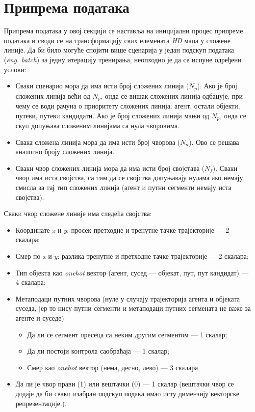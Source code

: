 \documentclass[11pt,oneside]{memoir}
\begin{document}
\section{Припрема података}

Припрема података у овој секцији се наставља на иницијални процес припреме података и своди се на трансформацију свих елемената
\textit{HD} мапа у сложене линије. Да би било могуће спојити више сценарија у један подскуп података (\textit{eng. batch}) 
за једну итерацију тренирања, неопходно је да се испуне одређени услови:
\begin{itemize}
  \item Сваки сценарио мора да има исти број сложених линија ($N_{p}$). Ако је број сложених линија већи од $N_{p}$, онда се 
        вишак сложених линија одбацује, при чему се води рачуна о приоритету сложених линија: агент, остали објекти, путеви, путеви кандидати.
        Ако је број сложених линија мањи од $N_{p}$, онда се скуп допуњава сложеним линијама са нула чворовима.
  \item Свака сложена линија мора да има исти број чворова ($N_{n}$). Ово се решава аналогно броју сложених линија.
  \item Сваки чвор сложених линија мора да има исти број својстава ($N_{f}$). Сваки чвор има иста својства, са тим
        да се својства допуњавају нулама ако немају смисла за тај тип сложених линија (агент и путни сегменти немају иста својства).
\end{itemize}

\noindent Сваки чвор сложене линије има следећа својства:
\begin{itemize}
  \item Координате \textit{x} и \textit{y}: просек претходне и тренутне тачке трајекторије --- 2 скалара;
  \item Смер по \textit{x} и \textit{y}: разлика тренутне и претходне тачке трајекторије --- 2 скалара;
  \item Тип објекта као \textit{onehot} вектор (агент, сусед --- објекат, пут, пут кандидат) --- 4 скалара;
  \item Метаподаци путних чворова (нуле у случају трајекторија агента и објеката суседа, јер то нису путни сегменти
        и метаподаци путних сегмената не важе за агенте и суседе)
    \begin{itemize}
      \item Да ли се сегмент пресеца са неким другим сегментом --- 1 скалар;
      \item Да ли постоји контрола саобраћаја --- 1 скалар;
      \item Смер као \textit{onehot} вектор (нема, десно, лево) --- 3 скалара
    \end{itemize}
  \item Да ли је чвор прави (1) или вештачки (0) --- 1 скалар (вештачки чвор се додаје да би сваки
        изабран подскуп подака имао исту димензију векторске репрезентације.).
\end{itemize}
\end{document}
